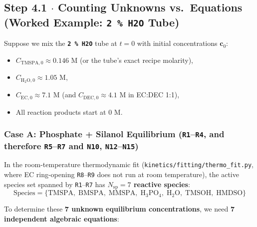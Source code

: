\documentclass[11pt,a4paper]{article}
\begin{document}
\subsection*{Step 4.1 $\cdot$ Counting Unknowns vs.\ Equations (Worked Example: \texttt{2 \% H2O} Tube)}

Suppose we mix the \textbf{\texttt{2 \% H2O}} tube at $t = 0$ with initial concentrations $\mathbf{c}_0$:
\begin{itemize}[leftmargin=1.8em]
    \item $C_{\text{TMSPA}, 0} \approx 0.146\text{ M}$ (or the tube's exact recipe molarity),
    \item $C_{\text{H}_2\text{O}, 0} \approx 1.05\text{ M}$,
    \item $C_{\text{EC}, 0} \approx 7.1\text{ M}$ (and $C_{\text{DEC}, 0} \approx 4.1\text{ M}$ in EC:DEC 1:1),
    \item All reaction products start at $0\text{ M}$.
\end{itemize}

\subsubsection*{Case A: Phosphate + Silanol Equilibrium (\texttt{R1}--\texttt{R4}, and therefore \texttt{R5}--\texttt{R7} and \texttt{N10}, \texttt{N12}--\texttt{N15})}

In the room-temperature thermodynamic fit (\texttt{kinetics/\allowbreak{}fitting/\allowbreak{}thermo\_\allowbreak{}fit.py}, where EC ring-opening \texttt{R8}--\texttt{R9} does not run at room temperature), the active species set spanned by \texttt{R1}--\texttt{R7} has \textbf{$N_{\text{sp}} = 7$ reactive species}:
\begin{equation}
\text{Species} = \{ \text{TMSPA},\; \text{BMSPA},\; \text{MMSPA},\; \text{H}_3\text{PO}_4,\; \text{H}_2\text{O},\; \text{TMSOH},\; \text{HMDSO} \}
\end{equation}

To determine these \textbf{7 unknown equilibrium concentrations}, we need \textbf{7 independent algebraic equations}:
\end{document}
